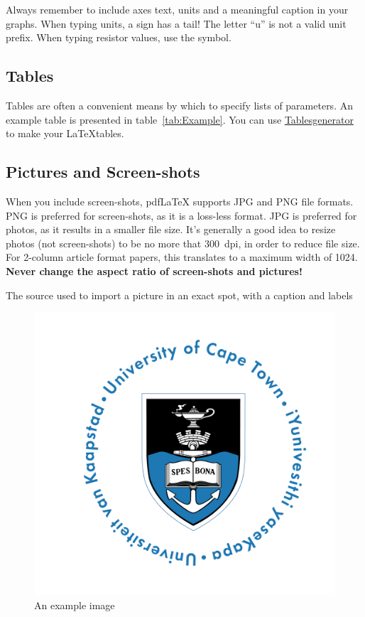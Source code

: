 Always remember to include axes text, units and a meaningful caption in your graphs.  When typing units, a \micro{} sign has a tail!  The letter ``u'' is not a valid unit prefix.  When typing resistor values, use the \Ohm{} symbol.

\subsection{Tables}
Tables are often a convenient means by which to specify lists of parameters.  An example table is presented in table~\ref{tab:Example}. You can use \href{https://www.tablesgenerator.com/}{Tablesgenerator} to make your \LaTeX tables.


\subsection{Pictures and Screen-shots}
When you include screen-shots, pdf\LaTeX{} supports JPG and PNG file formats.  PNG is preferred for screen-shots, as it is a loss-less format.  JPG is preferred for photos, as it results in a smaller file size.  It's generally a good idea to resize photos (not screen-shots) to be no more that 300~dpi, in order to reduce file size.  For 2-column article format papers, this translates to a maximum width of 1024.  \textbf{Never change the aspect ratio of screen-shots and pictures!}

The source used to import a picture in an exact spot, with a caption and labels

\begin{figure}[H]
    \centering
    \includegraphics[width=0.6\columnwidth]{Figures/UCT}
    \caption{An example image}
    \label{fig:imageExample}
\end{figure}

